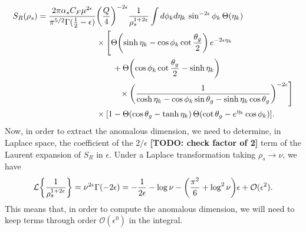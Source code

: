 \documentclass[../thesis.tex]{subfiles}
\providecommand{\cL}{\mathcal{L}}
\providecommand{\cO}{\mathcal{O}}
\begin{document}
	\begin{equation}\label{app_soft-eq:soft integral without kperp}
	\begin{aligned}
		S_R(\rho_s) = \frac{2\pi\alpha_s C_F\mu^{2\epsilon}}{\pi^{5/2} \Gamma(\frac{1}{2} - \epsilon)} &\qty(\frac{Q}{4})^{-2\epsilon} \frac{1}{\rho_s^{1+2\epsilon}} \int d\phi_k d\eta_k\, \sin^{-2\epsilon}\phi_k \, \Theta(\eta_k) \\
		&\times \Bigg[ \Theta\qty(\sinh\eta_k - \cos\phi_k\cot\frac{\theta_g}{2})\,e^{-2\epsilon\eta_k} \\
			&\qquad+ \Theta\qty(\cos\phi_k\cot\frac{\theta_g}{2} - \sinh\eta_k)\\
			&\hspace{1cm}\times \qty(\frac{1}{\cosh\eta_k - \cos\phi_k\sin\theta_g - \sinh\eta_k\cos\theta_g})^{-2\epsilon}\Bigg] \\
			&\times \qty[1 - \Theta(\cos\theta_g - \tanh\eta_k)\,\Theta\qty(\cot\theta_g - e^{\eta_k}\cos\phi_k)].
	\end{aligned}
	\end{equation}
	Now, in order to extract the anomalous dimension, we need to determine, in Laplace space, the coefficient of the $2/\epsilon$ {\color{red}\textbf{[TODO: check factor of 2]}} term of the Laurent expansion of $S_R$ in $\epsilon$. Under a Laplace transformation taking $\rho_s \to \nu$, we have
	\begin{equation}
		\cL\qty{\frac{1}{\rho_s^{1 + 2\epsilon}}} = \nu^{2\epsilon} \Gamma(-2\epsilon) = -\frac{1}{2\epsilon} - \log\nu - \qty(\frac{\pi^2}{6} + \log^2\nu)\epsilon + \cO(\epsilon^2).
	\end{equation}
	This means that, in order to compute the anomalous dimension, we will need to keep terms through order $\cO(\epsilon^0)$ in the integral.
\end{document}
